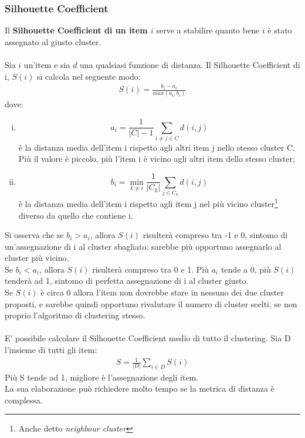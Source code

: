 \subsubsection{Silhouette Coefficient}
Il \textbf{Silhouette Coefficient di un item $i$} serve a stabilire quanto bene $i$ è stato assegnato al giusto cluster.\\
\\
Sia $i$ un'item e sia $d$ una qualsiasi funzione di distanza. Il Silhouette Coefficient di i, $S(i)$ si calcola nel seguente modo:
\begin{align}
	S(i) = \frac{b_i - a_i}{max(a_i, b_i)}
\end{align}
dove:
\begin{enumerate}[(i)]
	\item $$ a_i = \frac{1}{|C|-1}\sum_{i\ne j\in C} d(i,j)$$ è la distanza media dell'item i rispetto agli altri item j nello stesso cluster C.\\
	Più il valore è piccolo, più l'item i è vicino agli altri item dello stesso cluster;
	\item $$ b_i = \min_{k\ne i} \frac{1}{|C_k|}\sum_{j \in C_k} d(i,j)$$ è la distanza media dell'item i rispetto agli item j nel più vicino cluster\footnote{Anche detto \textit{neighbour cluster}} diverso da quello che contiene i.
\end{enumerate}
Si osserva che se $b_i > a_i$, allora $S(i)$ risulterà compreso tra -1 e 0, sintomo di un'assegnazione di i al cluster sbagliato: sarebbe più opportuno assegnarlo al cluster più vicino.\\
Se $b_i < a_i$, allora $S(i)$ risulterà compreso tra 0 e 1. Più $a_i$ tende a 0, più $S(i)$ tenderà ad 1, sintomo di perfetta assegnazione di i al cluster giusto.\\
Se $S(i)$ è circa 0 allora l'item non dovrebbe stare in nessuno dei due cluster proposti, e sarebbe quindi opportuno rivalutare il numero di cluster scelti, se non proprio l'algoritmo di clustering stesso.\\
\\
E' possibile calcolare il Silhouette Coefficient medio di tutto il clustering. Sia D l'insieme di tutti gli item:
\begin{align}
	S = \frac{1}{|D|} \sum_{i \in D} S(i)
\end{align}
Più S tende ad 1, migliore è l'assegnazione degli item.\\
La sua elaborazione può richiedere molto tempo se la metrica di distanza è complessa.

